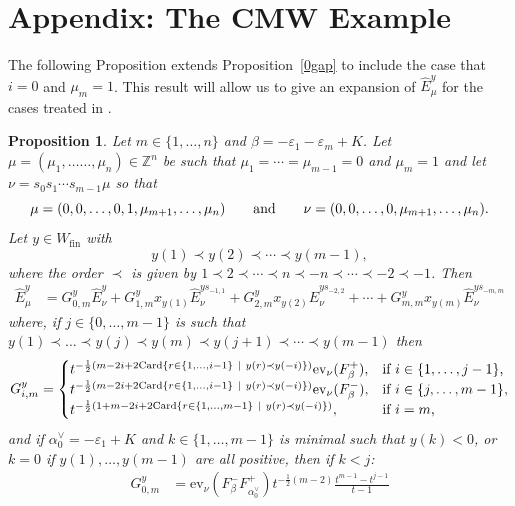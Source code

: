 \documentclass[11pt]{article}
\theoremstyle{plain}
\newtheorem{prop}[thm]{Proposition}
\theoremstyle{definition}
\theoremstyle{remark}
\numberwithin{equation}{section}
\def\ZZ{\mathbb{Z}}
\def\Card{\mathrm{Card}}
\def\ev{\mathrm{ev}}
\newcounter{r}
\newcounter{s}
\begin{document}
\newpage




\section{Appendix: The CMW Example}\label{sec: examples}
\allowdisplaybreaks


The following Proposition extends Proposition~\ref{0gap} to include the case that $i=0$ and $\mu_m=1$.
This result will allow us to give an expansion of $\widehat{E}^y_\mu$ for the cases treated in 
\cite[Theorem 1.10]{CMW23}.


\begin{prop} \label{0tomgapB} Let $m\in \{1, \ldots, n\}$ and $\beta = -\varepsilon_1-\varepsilon_m+K$.
Let $\mu = (\mu_1, \ldots \ldots, \mu_n)\in \ZZ^n$ be
such that $\mu_1=\cdots=\mu_{m-1}=0$ and $\mu_m=1$ 
and let $\nu =s_0s_1\cdots  s_{m-1}\mu$ so that
$$
\mu = (0,0,\ldots, 0, 1, \mu_{m+1}, \ldots, \mu_n)
\qquad\hbox{and}\qquad
\nu = (0, 0, \ldots, 0, \mu_{m+1}, \ldots, \mu_n).
$$
Let $y\in W_{\mathrm{fin}}$ with 
$$y(1)\prec y(2)\prec \cdots \prec y(m-1),$$
where the order $\prec$ is given by $1\prec 2\prec \cdots \prec n \prec -n \prec \cdots \prec -2 \prec -1$.  
Then
\begin{align*}
\widehat{E}^y_\mu 
&= G_{0,m}^y \widehat{E}^y_\nu
+G_{1,m}^y x_{y(1)} \widehat{E}^{ys_{-1,1}}_\nu
+G_{2,m}^y x_{y(2)} \widehat{E}^{ys_{-2,2}}_\nu
+\cdots
+G_{m,m}^y x_{y(m)} \widehat{E}^{ys_{-m,m}}_\nu
\end{align*}
where, if $j\in \{0, \ldots, m-1\}$ is such that
$y(1)\prec \ldots \prec y(j)\prec y(m)\prec y(j+1)\prec \cdots \prec y(m-1)$ then 
$$
G_{i,m}^y = \begin{cases}
t^{-\frac12(m-2i+2\Card\{r\in \{1, \ldots, i-1\}\ |\ y(r)\prec y(-i)\})} \ev_\nu(F^+_\beta),
&\hbox{if $i\in \{1, \ldots, j-1\}$,} \\
t^{-\frac12(m-2i+2\Card\{r\in \{1, \ldots, i-1\}\ |\ y(r)\prec y(-i)\})} \ev_\nu(F^-_\beta),
&\hbox{if $i\in \{j, \ldots, m-1\}$,} \\
t^{-\frac12(1+m-2i+2\Card\{r\in \{1, \ldots, m-1\}\ |\ y(r)\prec y(-i)\})}, &\hbox{if $i=m$,}
\end{cases}
$$
and if $\alpha_0^\vee = -\varepsilon_1+K$ and $k\in \{1, \ldots, m-1\}$ is minimal such that $y(k)<0$, or $k = 0$ if $y(1), \ldots, y(m-1)$ are all positive, then if $k < j$:
\begin{align*}
G_{0,m}^y 
&= \ev_\nu(F^-_\beta F^+_{\alpha^\vee_0}) t^{-\frac{1}{2}(m-2)} \frac{t^{m-1} - t^{j-1}}{t-1}

\end{align*}
\end{prop}
\end{document}
